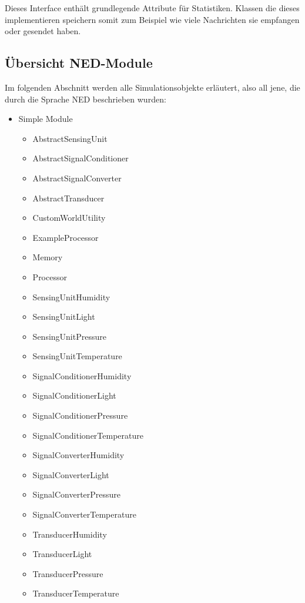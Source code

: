 Dieses Interface enthält grundlegende Attribute für Statistiken. Klassen die dieses implementieren speichern somit zum Beispiel wie viele Nachrichten sie empfangen oder gesendet haben.

\subsection{Übersicht NED-Module}

Im folgenden Abschnitt werden alle Simulationsobjekte erläutert, also all jene, die durch die Sprache NED beschrieben wurden:

\begin{minipage}{\textwidth}
\begin{itemize}{\label{enum:NedModules}}
\item Simple Module
\begin{multicols}{2}
\begin{itemize}
\item AbstractSensingUnit
\item AbstractSignalConditioner
\item AbstractSignalConverter
\item AbstractTransducer
\item CustomWorldUtility
\item ExampleProcessor
\item Memory
\item Processor
\item SensingUnitHumidity
\item SensingUnitLight
\item SensingUnitPressure
\item SensingUnitTemperature
\item SignalConditionerHumidity
\item SignalConditionerLight
\item SignalConditionerPressure
\item SignalConditionerTemperature
\item SignalConverterHumidity
\item SignalConverterLight
\item SignalConverterPressure
\item SignalConverterTemperature
\item TransducerHumidity
\item TransducerLight
\item TransducerPressure
\item TransducerTemperature 
\end{itemize}

\end{multicols}
\end{itemize}
\end{minipage}
